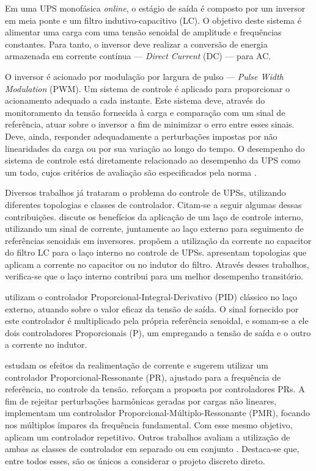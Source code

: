 \documentclass[repeatfields,oneside,overleaf]{tcc}
\begin{document}
Em uma UPS monofásica \textit{online}, o estágio de saída é composto por um inversor em meia ponte e um filtro indutivo-capacitivo (LC).
O objetivo deste sistema é alimentar uma carga com uma tensão senoidal de amplitude e frequências constantes.
Para tanto, o inversor deve realizar a conversão de energia armazenada em corrente contínua --- \textit{Direct Current} (DC) --- para AC.

O inversor é acionado por modulação por largura de pulso --- \textit{Pulse Width Modulation} (PWM).
Um sistema de controle é aplicado para proporcionar o acionamento adequado a cada instante.
Este sistema deve, através do monitoramento da tensão fornecida à carga e comparação com um sinal de referência, atuar sobre o inversor a fim de minimizar o erro entre esses sinais.
Deve, ainda, responder adequadamente a perturbações impostas por não linearidades da carga ou por sua variação ao longo do tempo.
O desempenho do sistema de controle está diretamente relacionado ao desempenho da UPS como um todo, cujos critérios de avaliação são especificados pela norma \textcite{IEC62040-3:2011}.

Diversos trabalhos já trataram o problema do controle de UPSs, utilizando diferentes topologias e classes de controlador.
Citam-se a seguir algumas dessas contribuições.
%
\textcite{Finn1993} discute os benefícios da aplicação de um laço de controle interno, utilizando um sinal de corrente, juntamente ao laço externo para seguimento de referências senoidais em inversores.
\textcite{Abdel1996} propõem a utilização da corrente no capacitor do filtro LC para o laço interno no controle de UPSs.
\textcite{Ryan1997} apresentam topologias que aplicam a corrente no capacitor ou no indutor do filtro.
Através desses trabalhos, verifica-se que o laço interno contribui para um melhor desempenho transitório.

\textcite{Willmann2007} utilizam o controlador Proporcional-Integral-Derivativo (PID) clássico no laço externo, atuando sobre o valor eficaz da tensão de saída.
O sinal fornecido por este controlador é multiplicado pela própria referência senoidal, e somam-se a ele dois controladores Proporcionais (P), um empregando a tensão de saída e o outro a corrente no indutor.

\textcite{Loh2003} estudam os efeitos da realimentação de corrente e sugerem utilizar um controlador Proporcional-Ressonante (PR), ajustado para a frequência de referência, no controle da tensão.
\textcite{Teodorescu2006} reforçam a proposta por controladores PRs.
A fim de rejeitar perturbações harmônicas geradas por cargas não lineares, \textcite{Pereira2014, Keiel2017, Keiel2019, Bertoldi2019, Lorenzini2019} implementam um controlador Proporcional-Múltiplo-Ressonante (PMR), focando nos múltiplos ímpares da frequência fundamental.
Com esse mesmo objetivo, \textcite{Escobar2007} aplicam um controlador repetitivo.
Outros trabalhos avaliam a utilização de ambas as classes de controlador em separado \cite{Flores2012} ou em conjunto \cite{Lorenzini2013, Lorenzini2015}.
Destaca-se que, entre todos esses, \textcite{Keiel2017, Keiel2019} são os únicos a considerar o projeto discreto direto.
\end{document}

